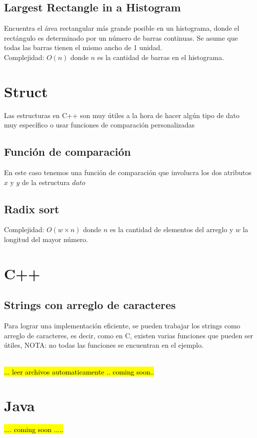 \documentclass[10pt,letterpaper,twocolumn]{article}
\newcommand{\source}[1]{
  
  \dotfill
}
\begin{document}
  \subsection{Largest Rectangle in a Histogram}
    Encuentra el área rectangular más grande posible en un histograma, donde el rectángulo es determinado por un número de barras continuas. Se asume que todas las barras tienen el mismo ancho de 1 unidad. \\
    Complejidad: $O(n)$ donde $n$ es la cantidad de barras en el histograma.
    \source{./src/largest_rectangle.cpp}

\section{Struct}
  Las estructuras en C++ son muy útiles a la hora de hacer algún tipo de dato muy específico o usar funciones de comparación personalizadas
  \subsection{Función de comparación}
  En este caso tenemos una función de comparación que involucra los dos atributos $x$ y $y$ de la estructura $dato$
  \source{./src/struct.cpp}
  \subsection{Radix sort}
  Complejidad: $O(w \times n)$ donde $n$ es la cantidad de elementos del arreglo y $w$ la longitud del mayor número.\\
  \source{./src/radixSort.cpp}

\section{C++}
  \subsection{Strings con arreglo de caracteres}
  Para lograr una implementación eficiente, se pueden trabajar los strings como arreglo de caracteres, es decir, como en C, existen varias funciones que pueden ser útiles, NOTA: no todas las funciones se encuentran en el ejemplo.
  \source{./src/getsScanfGetline.cpp}\\
  \hl{... leer archivos automaticamente .. coming soon..}

\section{Java}
 \hl{.... coming soon .....}
\end{document}
